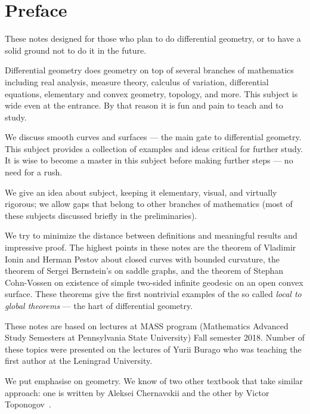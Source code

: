 
\chapter*{Preface}

These notes designed for those who plan to do differential geometry,
or to have a solid ground not to do it in the future.

Differential geometry does geometry on top of several branches of mathematics including 
real analysis, 
measure theory,
calculus of variation,
differential equations,
elementary and convex geometry,
topology, and more.
This subject is wide even at the entrance. 
By that reason it is fun and pain to teach and to study.

We discuss smooth curves and surfaces --- the main gate to differential geometry.
This subject provides a collection of examples and ideas critical for further study.
It is wise to become a master in this subject before making further steps --- no need for a rush.

We give an idea about subject, keeping it elementary, visual, and virtually rigorous; we allow gaps that belong to other branches of mathematics (most of these subjects discussed briefly in the preliminaries).

We try to minimize the distance between definitions and meaningful results and impressive proof.
The highest points in these notes are
the theorem of Vladimir Ionin and Herman Pestov about closed curves with bounded curvature,
the theorem of Sergei Bernstein's on saddle graphs,
and the theorem of Stephan Cohn-Vossen on existence of simple two-sided infinite geodesic on an open convex surface.
These theorems give the first nontrivial examples of the so called {}\emph{local to global theorems} --- the hart of differential geometry. 

These notes are based on lectures at MASS program (Mathematics Advanced Study Semesters at Pennsylvania State University) Fall semester 2018.
Number of these topics were presented on the lectures of Yurii Burago who was teaching the first author at the Leningrad University.

We put emphasise on geometry.
We know of two other textbook that take similar approach: one is written by Aleksei Chernavskii \cite{chernavsky} and the other by Victor Toponogov~\cite{toponogov}.


\newpage
\tableofcontents
